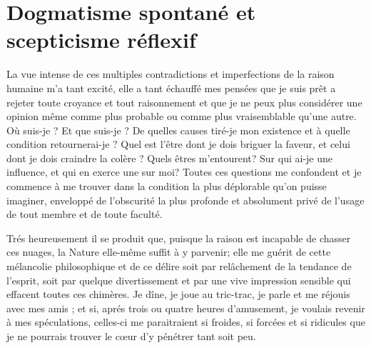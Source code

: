 
\section{Dogmatisme spontané et scepticisme réflexif}

La vue intense de ces multiples contradictions et imperfections
de la raison humaine m’a tant excité, elle a tant
échauffé mes pensées que je suis prêt a rejeter toute
croyance et tout raisonnement et que je ne peux plus
considérer une opinion même comme plus probable ou
comme plus vraisemblable qu’une autre. Où suis-je ?
Et que suis-je ? De quelles causes tiré-je mon existence
et à quelle condition retournerai-je ? Quel est l’être dont
je dois briguer la faveur, et celui dont je dois craindre la
colère ? Quels êtres m’entourent? Sur qui ai-je une
influence, et qui en exerce une sur moi? Toutes ces
questions me confondent et je commence à me trouver
dans la condition la plus déplorable qu’on puisse imaginer,
enveloppé de l’obscurité la plus profonde et absolument
privé de l’usage de tout membre et de toute
faculté.

Trés heureusement il se produit que, puisque la raison
est incapable de chasser ces nuages, la Nature elle-même
suffit à y parvenir; elle me guérit de cette mélancolie
philosophique et de ce délire soit par relâchement de la
tendance de l’esprit, soit par quelque divertissement et
par une vive impression sensible qui effacent toutes ces
chimères. Je dîne, je joue au tric-trac, je parle et me réjouis
avec mes amis ; et si, aprés trois ou quatre heures d’amusement,
je voulais revenir à mes spéculations, celles-ci
me paraitraient si froides, si forcées et si ridicules que
je ne pourrais trouver le c{\oe}ur d’y pénétrer tant soit
peu.

